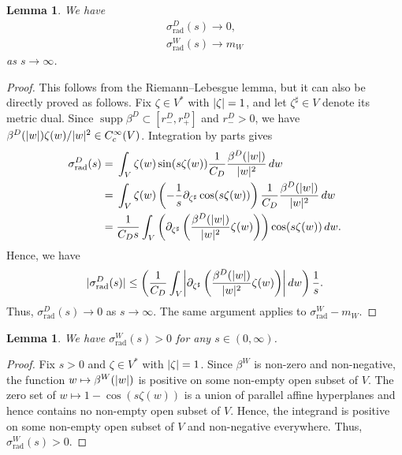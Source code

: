 \documentclass[a4paper,oneside,12pt]{amsart}
\theoremstyle{plain}
\newtheorem{lemma}[theorem]{Lemma}
\theoremstyle{definition}
\theoremstyle{remark}
\DeclarePairedDelimiter{\abs}{\lvert}{\rvert}
\DeclareMathOperator{\support}{supp}
\newcommand{\cutoff}{\beta}
\newcommand{\cutoffDirac}{\cutoff^D}
\newcommand{\cutoffWilson}{\cutoff^W}
\newcommand{\symbolDirac}{\sigma^D}
\newcommand{\symbolWilson}{\sigma^W}
\newcommand{\radialsymbolDirac}{\symbolDirac_{\mathrm{rad}}}
\newcommand{\radialsymbolWilson}{\symbolWilson_{\mathrm{rad}}}
\begin{document}
\begin{lemma}\label{lemma: asymptotics s to infinity}
  We have
  \begin{gather}
    \radialsymbolDirac(s) \to 0, \\
    \radialsymbolWilson(s) \to m_W
  \end{gather}
  as $s \to \infty$.
\end{lemma}
\begin{proof}
  This follows from the Riemann--Lebesgue lemma, but it can also be directly proved as follows.
  Fix $\zeta \in V^*$ with $\abs{\zeta}=1$, and let $\zeta^{\sharp} \in V$ denote its metric dual.
  Since $\support \cutoffDirac \subset [r_-^D,r_+^D]$ and $r_-^D > 0$, we have $\cutoffDirac(\abs{w}) \zeta(w)/\abs{w}^2 \in C^{\infty}_c(V)$.
  Integration by parts gives
  \begin{equation}
    \begin{aligned}
    \radialsymbolDirac(s) ={}& \int_V \zeta(w) \sin(s\zeta(w)) \frac{1}{C_D} \frac{\cutoffDirac(\abs{w})}
  {\abs{w}^2} \,dw \\
  ={}& \int_V \zeta(w) \left( -\frac{1}{s} \partial_{\zeta^{\sharp}} \cos(s\zeta(w)) \right) \frac{1}{C_D} \frac{\cutoffDirac(\abs{w})}{\abs{w}^2} \,dw \\
  ={}& \frac{1}{C_D s} \int_V \left( \partial_{\zeta^{\sharp}} \left(\frac{\cutoffDirac(\abs{w})}{\abs{w}^2} \zeta(w)\right) \right) \cos(s\zeta(w)) \,dw.
    \end{aligned}
  \end{equation}
  Hence, we have
  \begin{equation}
    \abs{\radialsymbolDirac(s)} \le \left(\frac{1}{C_D} \int_V \abs*{\partial_{\zeta^{\sharp}} \left(\frac{\cutoffDirac(\abs{w})}{\abs{w}^2} \zeta(w)\right)} \,dw\right) \frac{1}{s}.
  \end{equation}
  Thus, $\radialsymbolDirac(s) \to 0$ as $s \to \infty$.
  The same argument applies to $\radialsymbolWilson - m_W$.
\end{proof}

\begin{lemma}\label{lemma: radialsymbolWilson positive}
  We have $\radialsymbolWilson(s) > 0$ for any $s \in (0,\infty)$.
\end{lemma}
\begin{proof}
  Fix $s > 0$ and $\zeta \in V^*$ with $\abs{\zeta}=1$.
  Since $\cutoffWilson$ is non-zero and non-negative, the function $w \mapsto \cutoffWilson(\abs{w})$ is positive on some non-empty open subset of $V$.
  The zero set of $w \mapsto 1-\cos(s\zeta(w))$ is a union of parallel affine hyperplanes
  and hence contains no non-empty open subset of $V$.
  Hence, the integrand is positive on some non-empty open subset of $V$ and non-negative everywhere.
  Thus, $\radialsymbolWilson(s) > 0$.
\end{proof}
\end{document}
